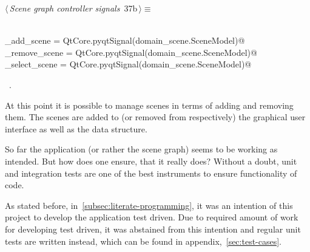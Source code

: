 \documentclass[
    a4paper,      %
    10pt,         %
    openright,    %
    notitlepage,  %
    parskip=half, %
]{scrreprt}       %
\theoremstyle{definition}                    %
\begin{document}
\begin{flushleft} \small
\begin{minipage}{\linewidth}\label{scrap45}\raggedright\small
{} $\langle\,${\itshape Scene graph controller signals}\nobreak\ {\footnotesize {37b}}$\,\rangle\equiv$
\vspace{-1exm}
\begin{list}{}{} \item
\mbox{}\lstinline@@\\
\mbox{}\lstinline@do_add_scene    = QtCore.pyqtSignal(domain_scene.SceneModel)@\\
\mbox{}\lstinline@do_remove_scene = QtCore.pyqtSignal(domain_scene.SceneModel)@\\
\mbox{}\lstinline@do_select_scene = QtCore.pyqtSignal(domain_scene.SceneModel)@\\
\mbox{}\lstinline@@{\NWsep}
\end{list}
\vspace{-1.5ex}
\footnotesize
\begin{list}{}{\setlength{\itemsep}{-\parsep}\setlength{\itemindent}{-\leftmargin}}
\item \NWtxtMacroRefIn\ .

\item{}
\end{list}
\end{minipage}\vspace{4ex}
\end{flushleft}

At this point it is possible to manage scenes in terms of adding and removing
them. The scenes are added to (or removed from respectively) the graphical user
interface as well as the data structure.

So far the application (or rather the scene graph) seems to be working as
intended. But how does one ensure, that it really does? Without a doubt, unit
and integration tests are one of the best instruments to ensure functionality of
code.

As stated before, in~\autoref{subsec:literate-programming}, it was an intention
of this project to develop the application test driven. Due to required amount
of work for developing test driven, it was abstained from this intention and
regular unit tests are written instead, which can be found in
appendix,~\autoref{sec:test-cases}.
\end{document}
